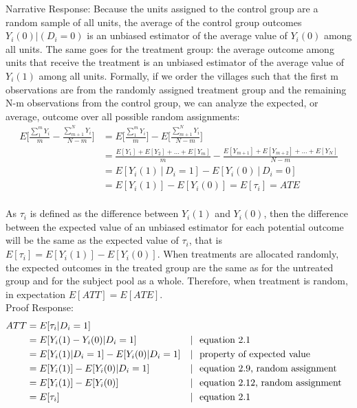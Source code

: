 \documentclass[11pt,notitlepage]{article}		%
\begin{document}

Narrative Response:
Because the units assigned to the control group are a random sample of all units, the average of the control group outcomes $Y_i (0)|(D_i=0)$ is an unbiased estimator of the average value of $Y_i (0)$ among all units.  The same goes for the treatment group: the average outcome among units that receive the treatment is an unbiased estimator of the average value of $Y_i (1)$ among all units.  Formally, if we order the villages such that the first m observations are from the randomly assigned treatment group and the remaining N-m observations from the control group, we can analyze the expected, or average, outcome over all possible random assignments:
\begin{align*}
E\bigg[\frac{\sum_1^m Y_i }{m}-\frac{\sum_{m+1}^N Y_i}{N-m}\bigg] &= E\bigg[\frac{\sum_1^m Y_i }{m}\bigg] - E\bigg[\frac{\sum_{m+1}^N Y_i}{N-m}\bigg]\\
&= \frac{E[Y_1 ]+E[Y_2 ]+ \ldots +E[Y_m]}{m}- \frac{E[Y_{m+1}]+E[Y_{m+2} ]+ \ldots +E[Y_N]}{N-m} \\
&= E[Y_i (1)│D_i=1]-E[Y_i (0)│D_i=0] \\
&= E[Y_i (1)]-E[Y_i (0)] = E[\tau_i] = ATE\\
\end{align*}

As $\tau_i$ is defined as the difference between $Y_i (1)$ and $Y_i (0)$, then the difference between the expected value of an unbiased estimator for each potential outcome will be the same as the expected value of $\tau_i$, that is $E[\tau_{i}] = E[Y_{i}(1)] - E[Y_{i}(0)]$. When treatments are allocated randomly, the expected outcomes in the treated group are the same as for the untreated group and for the subject pool as a whole. Therefore, when treatment is random, in expectation $E[ATT]=E[ATE]$.\\

Proof Response:
\begin{align*}
ATT&= E[ \tau_{i} \vert D_{i}=1]\\
&= E[Y_{i}(1)-Y_{i}(0)\vert D_{i}=1] &\vert \hspace{.25cm}& \text{equation 2.1}\\
&=E[Y_{i}(1)\vert D_{i}=1] - E[Y_{i}(0)\vert D_{i}=1]&\vert \hspace{.25cm}& \text{property of expected value}\\
&=E[Y_{i}(1)] - E[Y_{i}(0)\vert D_{i}=1]&\vert \hspace{.25cm}& \text{equation 2.9, random assignment}\\
&=E[Y_{i}(1)] - E[Y_{i}(0)]&\vert \hspace{.25cm}& \text{equation 2.12, random assignment}\\
&=E[\tau_{i}] &\vert \hspace{.25cm}& \text{equation 2.1}
\end{align*}
\end{document}
